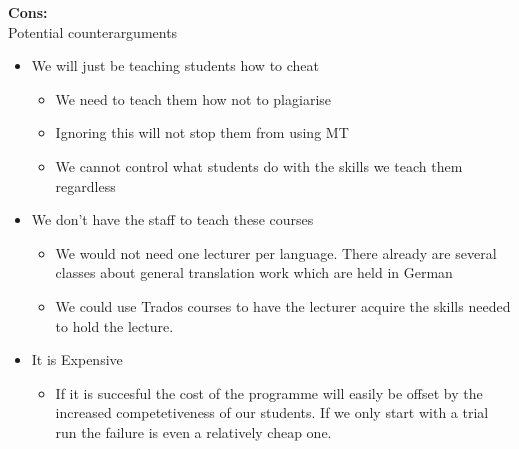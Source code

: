 \documentclass{article}
\begin{document}
	\textbf{Cons:} \\
	Potential counterarguments
	\begin{itemize}
		\item{We will just be teaching students how to cheat}
		\begin{itemize}
			\item{We need to teach them how not to plagiarise}
			\item{Ignoring this will not stop them from using MT}
			\item{We cannot control what students do with the skills we teach them regardless}
		\end{itemize}
		\item{We don't have the staff to teach these courses}
		\begin{itemize}
			\item{We would not need one lecturer per language. There already are several classes about general translation work which are held in German}
			\item{We could use Trados courses to have the lecturer acquire the skills needed to hold the lecture.}
		\end{itemize}
		\item{It is Expensive}
		\begin{itemize}
			\item{If it is succesful the cost of the programme will easily be offset by the increased competetiveness of our students. If we only start with a trial run the failure is even a relatively cheap one.}
		\end{itemize}
	\end{itemize}
	
\end{document}
